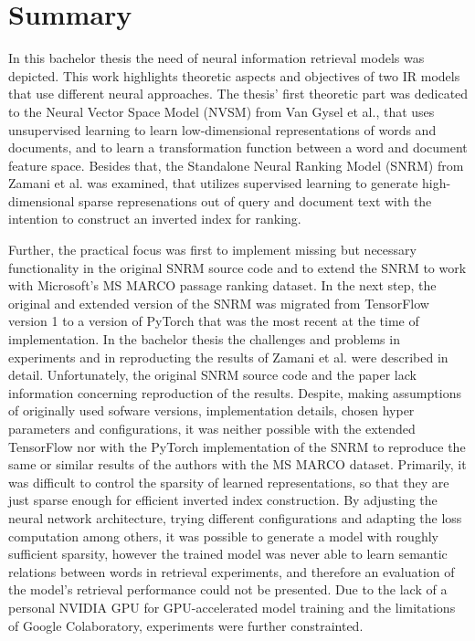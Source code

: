 \chapter{Summary}


In this bachelor thesis the need of neural information retrieval models was 
    depicted.
This work highlights theoretic aspects and objectives of
    two IR models that use different neural approaches.
The thesis' first theoretic part was dedicated to 
    the Neural Vector Space Model (NVSM) from Van Gysel et al.,
    that uses unsupervised learning to learn low-dimensional representations 
    of words and documents, and to learn a transformation function between
    a word and document feature space.
Besides that, the Standalone Neural Ranking Model (SNRM) from Zamani et al.
    was examined,
    that utilizes supervised learning to generate high-dimensional sparse
    represenations out of query and document text with the intention 
    to construct an inverted index for ranking.

Further, the practical focus was first to implement missing but necessary
    functionality in the original SNRM source code and to  
    extend the SNRM to work with
    Microsoft's MS MARCO passage ranking dataset.
In the next step, the original and extended version of the SNRM was
    migrated from TensorFlow version 1 to a
    version of PyTorch that was the most recent at the time of 
    implementation.
In the bachelor thesis the challenges and problems in experiments and 
    in reproducting the results of Zamani et al. were described in detail.
Unfortunately, the original SNRM source code and the paper lack 
    information concerning reproduction of the results.
Despite, making assumptions of originally used sofware versions,
    implementation details,
    chosen hyper parameters and configurations, it was neither possible
    with the extended TensorFlow nor with the PyTorch implementation of the SNRM 
    to reproduce the same or similar results of the authors 
    with the MS MARCO dataset.
Primarily, it was difficult to control the sparsity of
    learned representations, so that they are just sparse enough for
    efficient inverted index construction.
By adjusting the neural network architecture, 
    trying different configurations and adapting the loss computation
    among others,
    it was possible to generate a model with roughly sufficient sparsity,
    however the trained model was never able to learn semantic relations 
    between words in retrieval experiments, 
    and therefore an evaluation of the model's retrieval performance could not 
    be presented.
Due to the lack of a personal NVIDIA GPU for GPU-accelerated model training 
    and the limitations of Google Colaboratory, experiments were further 
    constrainted.

